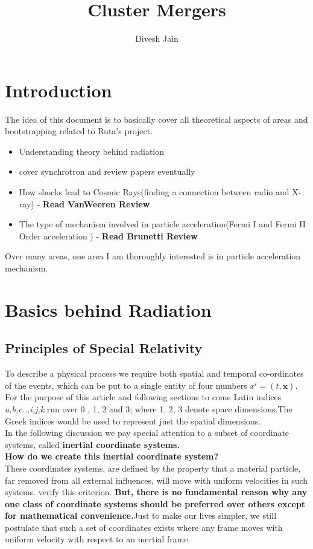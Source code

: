 \documentclass[11pt]{report}
\newcommand{\mbf}[1]{\mathbf{#1}}
\newcommand{\tit}[1]{\textit{#1}}
\begin{document}
\title{Cluster Mergers}
\author{Divesh Jain}
\maketitle
\tableofcontents

\chapter{Introduction}
The idea of this document is to basically cover all theoretical aspects of areas and bootstrapping related to Ruta's project. 
\begin{itemize}
\item Understanding theory behind radiation
\item cover synchrotron and review papers eventually
\item How shocks lead to Cosmic Rays(finding a connection between radio and X-ray) - \textbf{Read VanWeeren Review}
\item The type of mechanism involved in particle acceleration(Fermi I and Fermi II Order acceleration ) - \textbf{Read Brunetti Review}
\end{itemize}
Over many areas, one area I am thoroughly interested is in particle acceleration mechanism.
\chapter{Basics behind Radiation}
\section{Principles of Special Relativity}
To describe a physical process we require both spatial and temporal co-ordinates of the events, which can be put to a single entity of four numbers $x^i=(t,\mbf{x})$. For the purpose of this article and following sections to come Latin indices \tit{a,b,c..,i,j,k} run over 0 , 1, 2 and 3; where 1, 2, 3 denote space dimensions.The Greek indices would be used to represent just the spatial dimensions.\\

In the following discussion we pay special attention to a subset of coordinate systems, called \textbf{inertial coordinate systems.} \\
\textbf{How do we create this inertial coordinate system?}\\
These coordinates systems, are defined by the property that a material particle, far removed from all external influences, will move with uniform velocities in such systems. verify this criterion. \textbf{But, there is no fundamental reason why any one class of coordinate systems should be preferred over others except for mathematical convenience.}Just to make our lives simpler, we still postulate that such a set of coordinates exists where any frame moves with uniform velocity with respect to an inertial frame.\\
\end{document}
